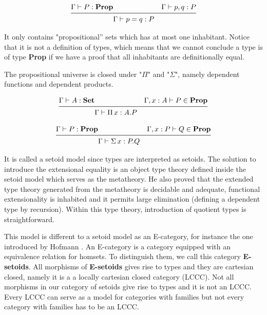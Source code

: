 \begin{equation}[proof-irr]
\begin{aligned}
\Gamma \vdash P : \textbf{Prop} & & \Gamma \vdash p,q : P & \\
\midrule
& \Gamma \vdash p=q : P & \\
\end{aligned}
\end{equation}

It only contains "propositional'' sets which has at most one
inhabitant. Notice that it is not a definition of types, which means
that we cannot conclude a type is of type \textbf{Prop} if we have a
proof that all
inhabitants are definitionally equal.

The propositional universe is closed under "$\Pi$" and "$\Sigma$", namely dependent functions
and dependent products.

\begin{equation}[\Pi-Prop]
\begin{aligned}
\Gamma \vdash A : \textbf{Set} & & \Gamma,x : A \vdash P \in \textbf{Prop} & \\
\midrule
& \Gamma \vdash \Pi\, x : A.P & \\
\end{aligned}
\end{equation}



\begin{equation}[\Sigma-Prop]
\begin{aligned}
\Gamma \vdash P : \textbf{Prop} & & \Gamma,x : P \vdash Q \in \textbf{Prop} & \\
\midrule
& \Gamma \vdash \Sigma\, x : P.Q & \\
\end{aligned}
\end{equation}



 It is called a setoid model since types are interpreted as setoids.
The solution to introduce the extensional equality is an object type theory defined inside the setoid model which serves as the metatheory. He also proved that the extended type theory generated from the metatheory is decidable and adequate, functional extensionality is
inhabited and it permits large elimination (defining a dependent type by recursion). Within this type theory,
introduction of quotient types is straightforward.

This model is different to a setoid model as an E-category, for instance
the one introduced by Hofmann \cite{hofmann1995interpretation} . An E-category is a category equipped with
an equivalence relation for homsets. To distinguish them, we call this
category \textbf{E-setoids}.  All morphisms of \textbf{E-setoids}
gives rise to types and they are cartesian closed, namely it is a a locally
cartesian closed category (LCCC). Not all morphisms in our category of setoids give
rise to types and it is not an LCCC. Every LCCC can serve as a model for categories with
families but not every category with families has to be an
LCCC. 

